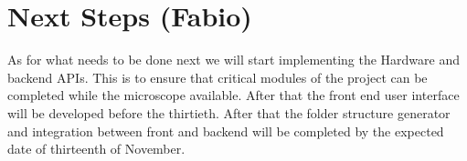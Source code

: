 \section{Next Steps (Fabio)}
As for what needs to be done next we will start implementing the Hardware and backend APIs. This is to ensure that critical modules of the project can be completed while the microscope available. After that the front end user interface will be developed before the thirtieth. After that the folder structure generator and integration between front and backend will be completed by the expected date of thirteenth of November.